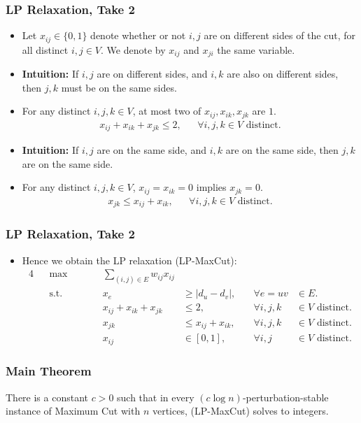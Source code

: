 \documentclass{beamer}
\begin{document}
    \begin{frame}
        \frametitle{LP Relaxation, Take 2}
    
        \begin{itemize}
            \item Let $x_{ij} \in \{ 0, 1 \}$ denote whether or not $i, j$ are on different sides of the cut, for all distinct $i, j \in V$. We denote by $x_{ij}$ and $x_{ji}$ the same variable. \pause
            \item {\bf Intuition:} If $i, j$ are on different sides, and $i, k$ are also on different sides, then $j, k$ must be on the same sides. \pause
            \item For any distinct $i, j, k \in V$, at most two of $x_{ij}, x_{ik}, x_{jk}$ are $1$. \pause
            \begin{align*}
                x_{ij} + x_{ik} + x_{jk} \leq 2, && \forall i, j, k \in V \text{ distinct}.
            \end{align*}
            \pause
            \vspace{-1em}
            \item {\bf Intuition:} If $i, j$ are on the same side, and $i, k$ are on the same side, then $j, k$ are on the same side. \pause
            \item For any distinct $i, j, k \in V$, $x_{ij} = x_{ik} = 0$ implies $x_{jk} = 0$. \pause
            \begin{align*}
                x_{jk} \leq x_{ij} + x_{ik}, && \forall i, j, k \in V \text{ distinct}.
            \end{align*}
        \end{itemize}
    \end{frame}

    \begin{frame}
        \frametitle{LP Relaxation, Take 2}
    
        \begin{itemize}
            \item Hence we obtain the LP relaxation {\sc (LP-MaxCut)}:
            \begin{alignat*}{4}
                && \max \qquad && \sum_{(i, j) \in E} w_{ij} x_{ij} \\
                && \text{s.t.} \qquad && x_e & \geq \left|d_u - d_v\right|, & \quad \forall e = uv & \in E. \\
                && && x_{ij} + x_{ik} + x_{jk} & \leq 2, & \quad \forall i, j, k & \in V \text{ distinct}. \\
                && && x_{jk} & \leq x_{ij} + x_{ik}, & \quad \forall i, j, k & \in V \text{ distinct}. \\
                && && x_{ij} & \in [0, 1], & \quad \forall i, j & \in V \text{ distinct}.
              \end{alignat*}
        \end{itemize}
    \end{frame}

    \begin{frame}
        \frametitle{Main Theorem}

        \begin{theorem}
            There is a constant $c > 0$ such that in every $(c \log n)$-perturbation-stable instance of {\sc Maximum Cut} with $n$ vertices, {\sc (LP-MaxCut)} solves to integers.
        \end{theorem}
    \end{frame}
\end{document}
